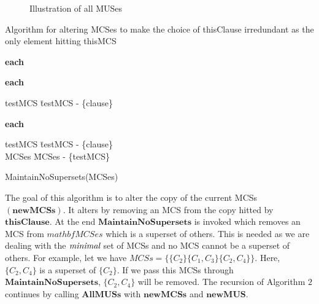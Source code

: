 \begin{figure}[htb] %
	\begin{center}
		
	\end{center}
	\caption{Illustration of all MUSes}
	\label{fig:graphallmuses}
\end{figure}
\begin{Algorithm}
	\caption{Algorithm for altering MCSes to make the choice of thisClause irredundant as the only element hitting thisMCS}
	\label{alg:propagatechoise}
	\begin{algorithm}{}{}
		\begin{FOR}{\textbf{each} }
			\begin{FOR}{\textbf{each} }
				\begin{IF}{}
					testMCS \= testMCS - \{clause\} \\
				\end{IF}
			\end{FOR}
		\end{FOR}
		\begin{FOR}{\textbf{each} }
			\begin{IF}{}
				testMCS \= testMCS - \{clause\} \\
				MCSes \= MCSes - \{testMCS\} \\
			\end{IF}
		\end{FOR}
		MaintainNoSupersets(MCSes)
	\end{algorithm}
\end{Algorithm}
The goal of this algorithm is to alter the copy of the current MCSs $(\mathbf{newMCSs})$. It alters by removing an MCS from the copy hitted by $\mathbf{thisClause}$. At the end $\mathbf{MaintainNoSupersets}$ is invoked which removes an MCS from $mathbf{MCSes}$ which is a superset of others. This is needed as we are dealing with the $\emph{minimal}$ set of MCSs and no MCS cannot be a superset of others. For example, let we have $MCSs=\{\{C_{2}\}\{C_{1}, C_{3}\}\{C_{2},C_{4}\}\}$. Here, $\{C_{2},C_{4}\}$ is a superset of $\{C_{2}\}$. If we pass this MCSs through $\mathbf{MaintainNoSupersets}$, $\{C_{2},C_{4}\}$ will be removed.\newline
The recursion of Algorithm $2$ continues by calling $\mathbf{AllMUSs}$ with $\mathbf{newMCSs}$ and $\mathbf{newMUS}$.
